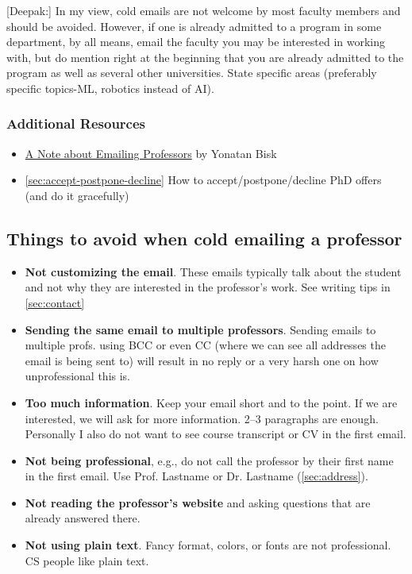 \documentclass[oneside,11pt,dvipsnames]{book}
\newenvironment{commentbox}[1][]{
  \small
  \begin{mybox}
    {\small \textbf{#1}}
  }{
  \end{mybox}
}
\begin{document}
\begin{commentbox}
  [Deepak:]
  In my view, cold emails are not welcome by most faculty members and should be avoided. However, if one is already admitted to a program in some department, by all means, email the faculty you may be interested in working with, but do mention right at the beginning that you are already admitted to the program as well as several other universities. State specific areas (preferably specific topics-ML, robotics instead of AI).
\end{commentbox}



\subsubsection*{Additional Resources}
\begin{itemize}
  \item \href{https://yonatanbisk.com/emailing_professors.html}{A Note about Emailing Professors} by Yonatan Bisk
  \item \autoref{sec:accept-postpone-decline} How to accept/postpone/decline PhD offers (and do it gracefully)
\end{itemize}


\subsection{Things to avoid when cold emailing a professor}

\begin{itemize}
    
    \item \textbf{Not customizing the email}. These emails typically talk about the student and not why they are interested in the professor's work. See writing tips in \autoref{sec:contact}
    \item \textbf{Sending the same email to multiple professors}. Sending emails to multiple profs. using BCC or even CC (where we can see all addresses the email is being sent to) will result in no reply or a very harsh one on how unprofessional this is.
    \item \textbf{Too much information}. Keep your email short and to the point. If we are interested, we will ask for more information. 2--3 paragraphs are enough.  Personally I also do not want to see course transcript or CV in the first email.
    \item \textbf{Not being professional}, e.g., do not call the professor by their first name in the first email.  Use Prof. Lastname or Dr. Lastname (\autoref{sec:address}).
    \item \textbf{Not reading the professor's website} and asking questions that are already answered there.
    \item \textbf{Not using plain text}. Fancy format, colors, or fonts are not professional. CS people like plain text.
\end{itemize}
\end{document}
